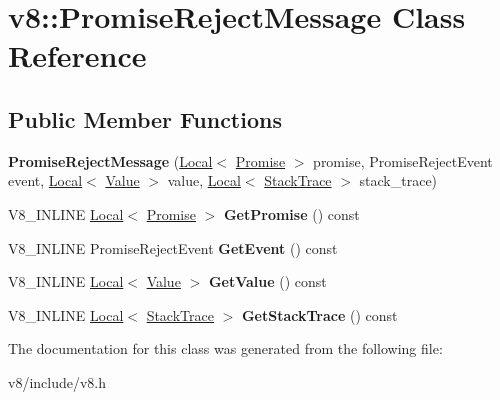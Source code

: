 \hypertarget{classv8_1_1PromiseRejectMessage}{}\section{v8\+:\+:Promise\+Reject\+Message Class Reference}
\label{classv8_1_1PromiseRejectMessage}
\subsection*{Public Member Functions}
\begin{DoxyCompactItemize}
\item 
\hypertarget{classv8_1_1PromiseRejectMessage_a052df173c75f1eb31b252714c88f3362}{}{\bfseries Promise\+Reject\+Message} (\hyperlink{classv8_1_1Local}{Local}$<$ \hyperlink{classv8_1_1Promise}{Promise} $>$ promise, Promise\+Reject\+Event event, \hyperlink{classv8_1_1Local}{Local}$<$ \hyperlink{classv8_1_1Value}{Value} $>$ value, \hyperlink{classv8_1_1Local}{Local}$<$ \hyperlink{classv8_1_1StackTrace}{Stack\+Trace} $>$ stack\+\_\+trace)\label{classv8_1_1PromiseRejectMessage_a052df173c75f1eb31b252714c88f3362}

\item 
\hypertarget{classv8_1_1PromiseRejectMessage_a8582107385b66f911c6d4c9a17890222}{}V8\+\_\+\+I\+N\+L\+I\+N\+E \hyperlink{classv8_1_1Local}{Local}$<$ \hyperlink{classv8_1_1Promise}{Promise} $>$ {\bfseries Get\+Promise} () const \label{classv8_1_1PromiseRejectMessage_a8582107385b66f911c6d4c9a17890222}

\item 
\hypertarget{classv8_1_1PromiseRejectMessage_a1380024500dac27eb74665701a80c6b0}{}V8\+\_\+\+I\+N\+L\+I\+N\+E Promise\+Reject\+Event {\bfseries Get\+Event} () const \label{classv8_1_1PromiseRejectMessage_a1380024500dac27eb74665701a80c6b0}

\item 
\hypertarget{classv8_1_1PromiseRejectMessage_ad87ec78d2e817b623d996f8db7d45ffc}{}V8\+\_\+\+I\+N\+L\+I\+N\+E \hyperlink{classv8_1_1Local}{Local}$<$ \hyperlink{classv8_1_1Value}{Value} $>$ {\bfseries Get\+Value} () const \label{classv8_1_1PromiseRejectMessage_ad87ec78d2e817b623d996f8db7d45ffc}

\item 
\hypertarget{classv8_1_1PromiseRejectMessage_a128480c73f5da540876e6f8b78859878}{}V8\+\_\+\+I\+N\+L\+I\+N\+E \hyperlink{classv8_1_1Local}{Local}$<$ \hyperlink{classv8_1_1StackTrace}{Stack\+Trace} $>$ {\bfseries Get\+Stack\+Trace} () const \label{classv8_1_1PromiseRejectMessage_a128480c73f5da540876e6f8b78859878}

\end{DoxyCompactItemize}


The documentation for this class was generated from the following file\+:\begin{DoxyCompactItemize}
\item 
v8/include/v8.\+h\end{DoxyCompactItemize}
